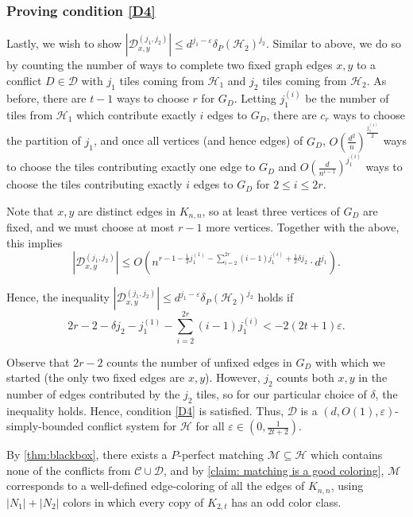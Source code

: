 \documentclass{article}
\theoremstyle{definition}
\newcommand\cH{{\mathcal H}}
\newcommand\cC{{\mathcal C}}
\newcommand{\cD}{\mathcal{D}}
\newcommand\cM{{\mathcal M}}
\begin{document}
\subsubsection{Proving condition \ref{D4}}

Lastly, we wish to show $|\cD_{x,y}^{(j_1,j_2)}| \leq d^{j_1 - \varepsilon} \delta_P(\cH_2)^{j_2}$.  Similar to above, we do so by counting the number of ways to complete two fixed graph edges $x,y$ to a conflict $D\in  \cD$ with $j_1$ tiles coming from $\cH_1$ and $j_2$ tiles coming from $\cH_2$.  As before, there are $t-1$ ways to choose $r$ for $G_D$.  Letting $j_1^{(i)}$ be the number of tiles from $\cH_1$ which contribute exactly $i$ edges to $G_D$, there are $c_r$ ways to choose the partition of $j_1$, and once all vertices (and hence edges) of $G_D$, $O \left( \frac{d^2}{n} \right)^\frac{j_1^{(1)}}{2}$ ways to choose the tiles contributing exactly one edge to $G_D$ and $O \left( \frac{d}{n^{i-1}} \right)^{j_1^{(i)}}$ ways to choose the tiles contributing exactly $i$ edges to $G_D$ for $2 \leq i \leq 2r$.  

Note that $x,y$ are distinct edges in $K_{n,n}$, so at least three vertices of $G_D$ are fixed, and we must choose at most $r - 1$ more vertices.  Together with the above, this implies
$$
    |\cD_{x,y}^{(j_1,j_2)}|
    \leq O \left( n^{r - 1 - \frac{1}{2} j_1^{(1)} - \sum_{i=2}^{2r} (i-1) j_1^{(i)} + \frac{1}{2} \delta j_2} \cdot d^{j_1} \right).
$$

Hence, the inequality $|\cD_{x,y}^{(j_1,j_2)}| \leq d^{j_1 - \varepsilon} \delta_P(\cH_2)^{j_2}$ holds if 
$$
    2r - 2 - \delta j_2 - j_1^{(1)} - \sum_{i=2}^{2r} (i-1) j_1^{(i)} < -2 (2t+1) \varepsilon.
$$

Observe that $2r - 2$ counts the number of unfixed edges in $G_D$ with which we started (the only two fixed edges are $x,y$).  However, $j_2$ counts both $x,y$ in the number of edges contributed by the $j_2$ tiles, so for our particular choice of $\delta$, the inequality holds.  Hence, condition \ref{D4} is satisfied.  Thus, $\cD$ is a $(d, O(1), \varepsilon)$-simply-bounded conflict system for $\cH$ for all $\varepsilon \in \left(0, \frac{1}{2t+2} \right)$.

By \cref{thm:blackbox}, there exists a $P$-perfect matching $\cM \subseteq \cH$ which contains none of the conflicts from $\cC \cup \cD$, and by \cref{claim: matching is a good coloring}, $\cM$ corresponds to a well-defined edge-coloring of all the edges of $K_{n,n}$, using $|N_1| + |N_2|$ colors in which every copy of $K_{2,t}$ has an odd color class.  
\end{document}
